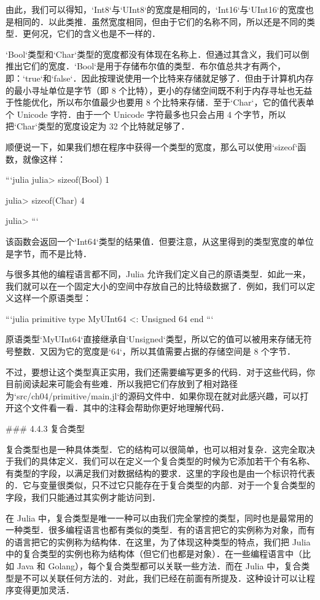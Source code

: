 由此，我们可以得知，`Int8`与`UInt8`的宽度是相同的，`Int16`与`UInt16`的宽度也是相同的．以此类推．虽然宽度相同，但由于它们的名称不同，所以还是不同的类型．更何况，它们的含义也是不一样的．

`Bool`类型和`Char`类型的宽度都没有体现在名称上．但通过其含义，我们可以倒推出它们的宽度．`Bool`是用于存储布尔值的类型．布尔值总共才有两个，即：`true`和`false`．因此按理说使用一个比特来存储就足够了．但由于计算机内存的最小寻址单位是字节（即 8 个比特），更小的存储空间既不利于内存寻址也无益于性能优化，所以布尔值最少也要用 8 个比特来存储．至于`Char`，它的值代表单个 Unicode 字符．由于一个 Unicode 字符最多也只会占用 4 个字节，所以把`Char`类型的宽度设定为 32 个比特就足够了．

顺便说一下，如果我们想在程序中获得一个类型的宽度，那么可以使用`sizeof`函数，就像这样：

```julia
julia> sizeof(Bool)
1

julia> sizeof(Char)
4

julia> 
```

该函数会返回一个`Int64`类型的结果值．但要注意，从这里得到的类型宽度的单位是字节，而不是比特．

与很多其他的编程语言都不同，Julia 允许我们定义自己的原语类型．如此一来，我们就可以在一个固定大小的空间中存放自己的比特级数据了．例如，我们可以定义这样一个原语类型：

```julia
primitive type MyUInt64 <: Unsigned 64 end
```

原语类型`MyUInt64`直接继承自`Unsigned`类型，所以它的值可以被用来存储无符号整数．又因为它的宽度是`64`，所以其值需要占据的存储空间是 8 个字节．

不过，要想让这个类型真正实用，我们还需要编写更多的代码．对于这些代码，你目前阅读起来可能会有些难．所以我把它们存放到了相对路径为`src/ch04/primitive/main.jl`的源码文件中．如果你现在就对此感兴趣，可以打开这个文件看一看．其中的注释会帮助你更好地理解代码．

### 4.4.3 复合类型

复合类型也是一种具体类型．它的结构可以很简单，也可以相对复杂．这完全取决于我们的具体定义．我们可以在定义一个复合类型的时候为它添加若干个有名称、有类型的字段，以满足我们对数据结构的要求．这里的字段也是由一个标识符代表的．它与变量很类似，只不过它只能存在于复合类型的内部．对于一个复合类型的字段，我们只能通过其实例才能访问到．

在 Julia 中，复合类型是唯一一种可以由我们完全掌控的类型，同时也是最常用的一种类型．很多编程语言也都有类似的类型．有的语言把它的实例称为对象，而有的语言把它的实例称为结构体．在这里，为了体现这种类型的特点，我们把 Julia 中的复合类型的实例也称为结构体（但它们也都是对象）．在一些编程语言中（比如 Java 和 Golang），每个复合类型都可以关联一些方法．而在 Julia 中，复合类型是不可以关联任何方法的．对此，我们已经在前面有所提及．这种设计可以让程序变得更加灵活．

